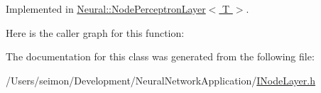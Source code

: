 Implemented in \hyperlink{class_neural_1_1_node_perceptron_layer_adb210d898fe61f2e167f228f3d1b2d95}{Neural::NodePerceptronLayer$<$ T $>$}.



Here is the caller graph for this function:




The documentation for this class was generated from the following file:\begin{DoxyCompactItemize}
\item 
/Users/seimon/Development/NeuralNetworkApplication/\hyperlink{_i_node_layer_8h}{INodeLayer.h}\end{DoxyCompactItemize}

